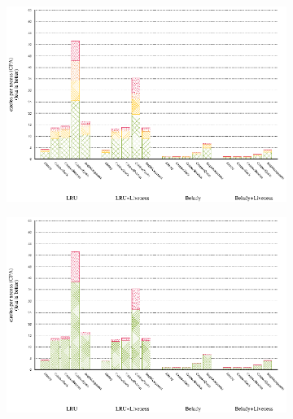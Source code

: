 \documentclass[onecolumn, openright, master, english, signatures]{dbrgrptt}
\begin{document}
\begin{figure}[!ht]
  \begin{subfigure}[b]{0.5\textwidth}%
    \includegraphics[width=\textwidth]{figs/plots/perf-deltablue.eps}
  \end{subfigure}%
  \begin{subfigure}[b]{0.5\textwidth}%
    \includegraphics[width=\textwidth]{figs/plots/perf-misses-deltablue.eps}
  \end{subfigure}%
  \caption{}
  \label{fig:todo}
\end{figure}
\end{document}
